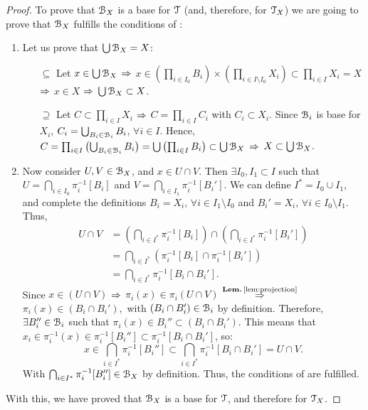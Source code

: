 \begin{proof}
	To prove that $\EuScript{B}_X$ is a base for $\EuScript{T}$ (and, therefore, for $\EuScript{T}_X$) we are going to prove that $\EuScript{B}_X$ fulfills
	the conditions of :
	\begin{enumerate}
		\item Let us prove that $\bigcup\EuScript{B}_X = X$:
		\begin{itemize}
			\item[$\boxed{\subseteq}$] Let $x\in \bigcup\EuScript{B}_X$ $\Rightarrow$ $x\in \left(\prod_{i\in I_0} B_i\right)\times\left(\prod_{i\in I\setminus I_0}X_i\right)\subset\prod_{i\in I} X_i = X$ $\Rightarrow$ $x\in X$ $\Rightarrow$ $\bigcup \EuScript{B}_X\subset X$.
			\item[$\boxed{\supseteq}$] Let $C\subset \prod_{i\in I}X_i$ $\Rightarrow$ $C=\prod_{i\in I}C_i$ with $C_i\subset X_i$.
			Since $\EuScript{B}_i$ is base for $X_i$, $C_i=\bigcup_{B_i\in \EuScript{B}_i} B_i$, $\forall i\in I$.
			Hence, $C=\prod_{i\in I}\left(\bigcup_{B_i\in \EuScript{B}_i} B_i\right) = \bigcup \left(\prod_{i\in I} B_i\right) \subset \bigcup \EuScript{B}_X$ $\Rightarrow$ $X\subset \bigcup \EuScript{B}_X$.
		\end{itemize}
		\item Now consider $U,V\in \EuScript{B}_X$, and $x\in U\cap V$. Then $\exists I_0, I_1 \subset I$ such that
		$U=\bigcap_{i\in I_0}\pi^{-1}_i[B_i]$ and $V=\bigcap_{i\in I_1}\pi^{-1}_i[B_i']$.
		We can define $I^*=I_0\cup I_1$, and complete the definitions $B_i=X_i,\,\forall i\in I_1\setminus I_0$ and
		$B_i'=X_i,\,\forall i\in I_0\setminus I_1$.
		Thus,
		\begin{align*}
			U\cap V &= \left(\bigcap_{i\in I^*}\pi^{-1}_i[B_i]\right)\cap\left(\bigcap_{i\in I^*}\pi^{-1}_i[B_i']\right)\\
			&= \bigcap_{i\in I^*}\left(\pi^{-1}_i[B_i]\cap\pi^{-1}_{i}[B_i']\right)\\
			&= \bigcap_{i\in I^*}\pi^{-1}_i[B_i\cap B_i'].
		\end{align*}
		Since $x\in (U\cap V)$ $\Rightarrow$ $\pi_i(x)\in\pi_i(U\cap V)$ $\overset{\lemref{lem:projection}}{\Then}$
		$\pi_i(x)\in (B_i\cap B_i'),$ with $(B_i\cap B_i')\in \EuScript{B}_i$ by definition.
		Therefore, $\exists B_i''\in \EuScript{B}_i$ such that $\pi_i(x)\in B_i''\subset (B_i\cap B_i')$.
		This means that $x_i\in \pi^{-1}_i(x) \in \pi^{-1}_i[B_i'']\subset \pi^{-1}_i[B_i\cap B_i']$,
		so:
		$$
		 x\in \bigcap_{i\in I^*}\pi^{-1}_i[B_i'']\subset \bigcap_{i\in I^*}\pi^{-1}_i[B_i\cap B_i'] = U\cap V.
		$$
		With $\bigcap_{i\in I^*}\pi^{-1}_i[B_i'']\in \EuScript{B}_X$ by definition.
		Thus, the conditions of  are fulfilled.
	\end{enumerate}
	With this, we have proved that $\EuScript{B}_X$ is a base for $\EuScript{T}$, and therefore for $\EuScript{T}_X$.
\end{proof}

